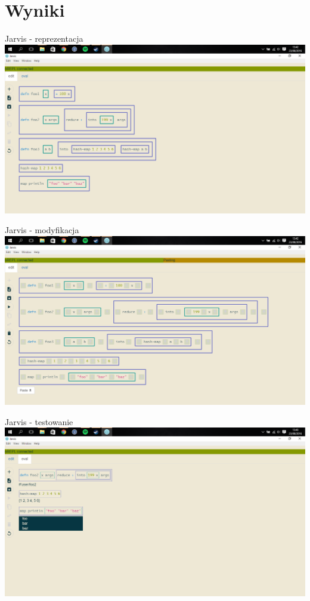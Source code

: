 \documentclass[presentation]{beamer}
\begin{document}
\section{Wyniki}
\label{sec-4}
\begin{frame}[label=sec-4-1]{Jarvis - reprezentacja}
\includegraphics[width=.9\linewidth]{./img/j-boxes.png}
\end{frame}
\begin{frame}[label=sec-4-2]{Jarvis - modyfikacja}
\includegraphics[width=.9\linewidth]{./img/j-insert.png}
\end{frame}
\begin{frame}[label=sec-4-3]{Jarvis - testowanie}
\includegraphics[width=.9\linewidth]{./img/j-eval.png}
\end{frame}
\end{document}
